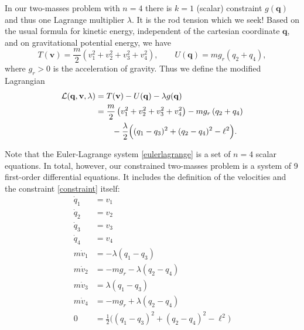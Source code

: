 \documentclass[letterpaper,final,12pt,reqno]{amsart}
\newcommand{\bq}{\mathbf{q}}
\newcommand{\bv}{\mathbf{v}}
\begin{document}
In our two-masses problem with $n=4$ there is $k=1$ (scalar) constraint $g(\bq)$ and thus one Lagrange multiplier $\lambda$.  It is the rod tension which we seek!  Based on the usual formula for kinetic energy, independent of the cartesian coordinate $\bq$, and on gravitational potential energy, we have
\begin{equation}
T(\bv) = \frac{m}{2} \left(v_1^2+v_2^2+v_3^2+v_4^2\right), \qquad U(\bq) = m g_r \left(q_2+q_4\right), \label{energies}
\end{equation}
where $g_r>0$ is the acceleration of gravity.  Thus we define the modified Lagrangian
\begin{align}
\mathcal{L}(\bq,\bv,\lambda) &= T(\bv) - U(\bq) - \lambda g(\bq) \label{lagrangian} \\
  &= \frac{m}{2} \left(v_1^2+v_2^2+v_3^2+v_4^2\right) - m g_r \left(q_2+q_4\right) \notag \\
  &\qquad - \frac{\lambda}{2} \Big((q_1 - q_3)^2 + (q_2 - q_4)^2 - \ell^2\Big). \notag
\end{align}

Note that the Euler-Lagrange system \eqref{eulerlagrange} is a set of $n=4$ scalar equations.  In total, however, our constrained two-masses problem is a system of 9 first-order differential equations.  It includes the definition of the velocities and the constraint \eqref{constraint} itself:
\begin{subequations}
\label{rawsystem}
\begin{align}
  \dot q_1 &= v_1 \\
  \dot q_2 &= v_2 \\
  \dot q_3 &= v_3 \\
  \dot q_4 &= v_4 \\
m \dot v_1 &= - \lambda (q_1 - q_3) \\
m \dot v_2 &= - m g_r - \lambda (q_2 - q_4) \\
m \dot v_3 &= \lambda (q_1 - q_3) \\
m \dot v_4 &= - m g_r + \lambda (q_2 - q_4) \\
         0 &= \frac{1}{2} \Big((q_1 - q_3)^2 + (q_2 - q_4)^2 - \ell^2\Big) \label{rawsystem:constraint}
\end{align}
\end{subequations}
\end{document}
